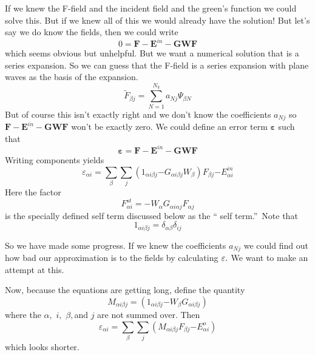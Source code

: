 \documentclass{article}
\begin{document}
If we knew the F-field and the incident field and the green's function we
could solve this. But if we knew all of this we would already have the
solution! But let's say we do know the fields, then we could write 
\begin{equation}
0=\mathbf{F-E}^{in}-\mathbf{GWF}
\end{equation}%
which seems obvious but unhelpful. But we want a numerical solution that is
a series expansion. So we can guess that the F-field is a series expansion
with plane waves as the basis of the expansion. 
\begin{equation}
\tilde{F}_{\beta j}\mathbf{=}\sum_{N=1}^{N_{k}}a_{Nj}\Psi _{\beta N}
\end{equation}%
But of course this isn't exactly right and we don't know the coefficients $%
a_{Nj}$ so $\mathbf{F-E}^{in}-\mathbf{GWF}$ won't be exactly zero. We could
define an error term $\mathbf{\varepsilon }$ such that 
\begin{equation}
\mathbf{\varepsilon }=\mathbf{F}-\mathbf{E}^{in}-\mathbf{GWF}
\end{equation}%
Writing components yields 
\begin{equation}
\varepsilon _{\alpha i}\mathbf{=}\sum_{\beta }\sum_{j}\left( 1_{\alpha
i\beta j}\mathbf{-}G_{\alpha i\beta j}W_{\beta }\right) F_{\beta j}\mathbf{-}%
E_{\alpha i}^{in}
\end{equation}%
Here the factor 
\begin{equation}
F_{\alpha i}^{st}=-W_{\alpha }G_{\alpha i\alpha j}F_{\alpha j}  \label{AST}
\end{equation}%
is the specially defined self term discussed below as the \textquotedblleft
self term.\textquotedblright\ Note that 
\begin{equation}
1_{\alpha i\beta j}=\delta _{\alpha \beta }\delta _{ij}
\end{equation}

So we have made some progress. If we knew the coefficients $a_{Nj}$ we could
find out how bad our approximation is to the fields by calculating $\mathbf{%
\varepsilon .}$ We want to make an attempt at this. 

Now, because the equations are getting long, define the quantity 
\begin{equation}
M_{\alpha i\beta j}=\left( 1_{\alpha i\beta j}\mathbf{-}W_{\beta }G_{\alpha
i\beta j}\right) 
\end{equation}%
where the $\alpha ,$ $i,$ $\beta ,$and $j$ are not summed over. Then 
\begin{equation}
\varepsilon _{\alpha i}\mathbf{=}\sum_{\beta }\sum_{j}\left( M_{\alpha
i\beta j}F_{\beta j}\mathbf{-}E_{\alpha i}^{o}\right)   \label{M}
\end{equation}%
which looks shorter.
\end{document}
